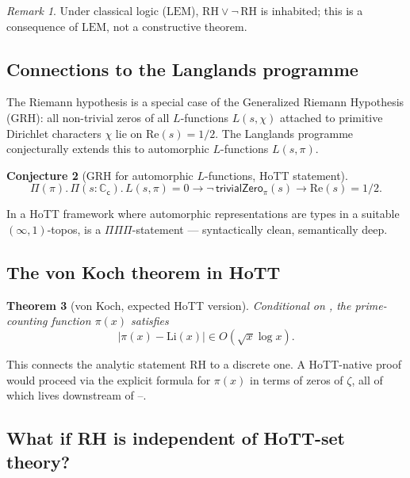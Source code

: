 \documentclass[12pt]{article}
\newtheorem{theorem}{Theorem}[section]
\newtheorem{conjecture}[theorem]{Conjecture}
\theoremstyle{definition}
\theoremstyle{remark}
\newtheorem{remark}[theorem]{Remark}
\newcommand{\C}{\mathbb{C}}
\newcommand{\Cc}{\C_{\mathsf{c}}}
\begin{document}
\begin{remark}\label{rem:LEM}
Under classical logic ($\mathrm{LEM}$), $\mathrm{RH} \vee \neg\,\mathrm{RH}$
is inhabited; this is a consequence of $\mathrm{LEM}$, not a constructive
theorem.
\end{remark}

\subsection{Connections to the Langlands programme}

The Riemann hypothesis is a special case of the Generalized Riemann
Hypothesis (GRH): all non-trivial zeros of all $L$-functions $L(s,\chi)$
attached to primitive Dirichlet characters $\chi$ lie on
$\mathrm{Re}(s) = 1/2$. The Langlands programme conjecturally extends this
to automorphic $L$-functions $L(s,\pi)$.

\begin{conjecture}[GRH for automorphic $L$-functions, HoTT statement]\label{conj:GRH}
\[
\Pi(\pi).\, \Pi(s:\Cc).\, L(s,\pi) = 0 \to
\neg\,\mathsf{trivialZero}_\pi(s) \to \mathrm{Re}(s) = 1/2.
\]
\end{conjecture}

In a HoTT framework where automorphic representations are types in a
suitable $(\infty,1)$-topos,  is a $\Pi\Pi\Pi$-statement —
syntactically clean, semantically deep.

\subsection{The von Koch theorem in HoTT}

\begin{theorem}[von Koch, expected HoTT version]\label{thm:vonKoch}
Conditional on , the prime-counting function $\pi(x)$
satisfies
\[
|\pi(x) - \mathrm{Li}(x)| \in O(\sqrt{x} \log x).
\]
\end{theorem}

This connects the analytic statement $\mathrm{RH}$ to a discrete one. A
HoTT-native proof would proceed via the explicit formula for $\pi(x)$ in
terms of zeros of $\zeta$, all of which lives downstream of
--.

\subsection{What if RH is independent of HoTT-set theory?}
\end{document}
